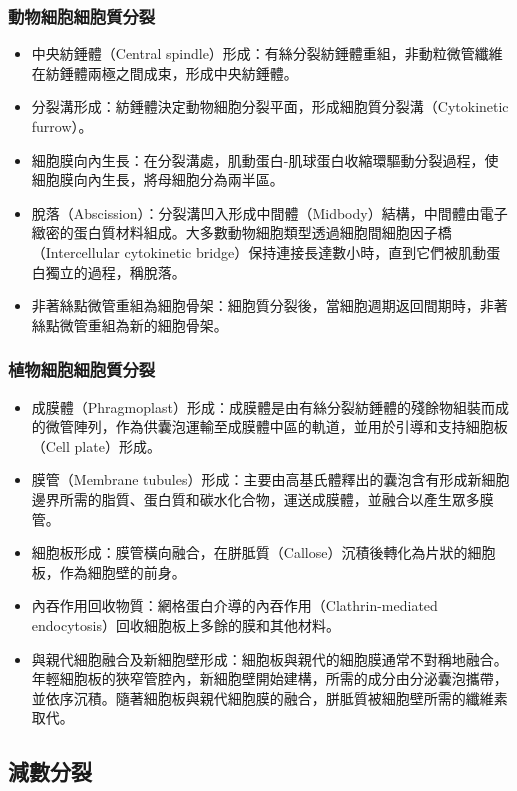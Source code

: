 \documentclass[a4paper,12pt]{report}
\begin{document}
\subsubsection{動物細胞細胞質分裂}
\begin{itemize}
  \item 中央紡錘體（Central spindle）形成：有絲分裂紡錘體重組，非動粒微管纖維在紡錘體兩極之間成束，形成中央紡錘體。
  \item 分裂溝形成：紡錘體決定動物細胞分裂平面，形成細胞質分裂溝（Cytokinetic furrow）。
  \item 細胞膜向內生長：在分裂溝處，肌動蛋白-肌球蛋白收縮環驅動分裂過程，使細胞膜向內生長，將母細胞分為兩半區。
  \item 脫落（Abscission）：分裂溝凹入形成中間體（Midbody）結構，中間體由電子緻密的蛋白質材料組成。大多數動物細胞類型透過細胞間細胞因子橋（Intercellular cytokinetic bridge）保持連接長達數小時，直到它們被肌動蛋白獨立的過程，稱脫落。
  \item 非著絲點微管重組為細胞骨架：細胞質分裂後，當細胞週期返回間期時，非著絲點微管重組為新的細胞骨架。
\end{itemize}
\subsubsection{植物細胞細胞質分裂}
\begin{itemize}
  \item 成膜體（Phragmoplast）形成：成膜體是由有絲分裂紡錘體的殘餘物組裝而成的微管陣列，作為供囊泡運輸至成膜體中區的軌道，並用於引導和支持細胞板（Cell plate）形成。
  \item 膜管（Membrane tubules）形成：主要由高基氏體釋出的囊泡含有形成新細胞邊界所需的脂質、蛋白質和碳水化合物，運送成膜體，並融合以產生眾多膜管。
  \item 細胞板形成：膜管橫向融合，在胼胝質（Callose）沉積後轉化為片狀的細胞板，作為細胞壁的前身。
  \item 內吞作用回收物質：網格蛋白介導的內吞作用（Clathrin-mediated endocytosis）回收細胞板上多餘的膜和其他材料。
  \item 與親代細胞融合及新細胞壁形成：細胞板與親代的細胞膜通常不對稱地融合。年輕細胞板的狹窄管腔內，新細胞壁開始建構，所需的成分由分泌囊泡攜帶，並依序沉積。隨著細胞板與親代細胞膜的融合，胼胝質被細胞壁所需的纖維素取代。
\end{itemize}
\subsection{減數分裂}
\end{document}
